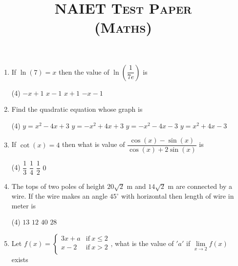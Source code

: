 \documentclass{article}
\title{\textsc{NAIET Test Paper\\(Maths)}}
\date{}
\begin{document}
\maketitle
\begin{enumerate}
    \item If \(  \ln(7) = x \) then the value of  \( \ln \left( \dfrac{1}{7e} \right) \) is
        \begin{tasks}(4)
        	\task \( -x + 1 \)
        	\task \( x - 1 \)
        	\task \( x + 1 \)
        	\task \( -x - 1 \)\ans
        \end{tasks}
    \item Find the quadratic equation whose graph is
        \begin{center}
        \end{center}
        \begin{tasks}(4)
        	\task \( y = x^2 - 4x + 3 \)\ans
        	\task \( y = -x^2 + 4x + 3 \)
        	\task \( y = -x^2 - 4x - 3 \)
        	\task \( y = x^2 + 4x - 3 \)
        \end{tasks}
    \item If \( \cot(x) = 4 \) then what is value of \( \dfrac{\cos(x) - \sin(x)}{\cos(x) + 2 \sin(x)} \) is
        \begin{tasks}(4)
        	\task \( \dfrac{1}{3} \)
        	\task \( \dfrac{1}{4} \)
        	\task \( \dfrac{1}{2} \)\ans
        	\task \( 0 \)
        \end{tasks}
    \item The tops of two poles of height \( 20\sqrt{2} \) m and \( 14 \sqrt{2}\) m are connected by a wire. If the wire makes an angle \( 45^\circ \) with horizontal then length of wire in meter is
        \begin{tasks}(4)
        	\task \( 13 \)
        	\task \( 12 \)\ans
        	\task \( 40 \)
        	\task \( 28 \)
        \end{tasks}
    \item Let \( f(x) = \begin{cases}
    			3x + a & \text{if} \ x \leq 2 \\
    			x - 2 & \text{if} \ x > 2 \\
    		   \end{cases} \), what is the value of \( 'a' \) if \( \lim\limits_{x \to 2} f(x) \) exists

\end{enumerate}
\end{document}
